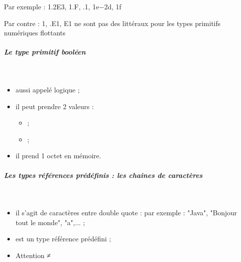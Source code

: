 \documentclass[11pt,a4paper]{article}
\begin{document}
          Par exemple : 1.2E3, 1.F, .1, 1e−2d, 1f
        
            \par
        
          Par contre : 1, .E1, E1 ne sont pas des litt\'eraux pour les types primitifs num\'eriques flottants
        
            \par
        
			
		\subparagraph{Le type primitif bool\'een} 
		
					\textcolor{white}{.} \par
				
            \par
        \verb@boolean@
					\begin{itemize}
				
			\item aussi appel\'e logique ; 
			\item  il peut prendre 2 valeurs :
              
					\begin{itemize}
				
			\item \verb@true@ ;
			\item \verb@false@ ;
					\end{itemize}
				
			\item il prend 1 octet en m\'emoire.
					\end{itemize}
				
            \par
        
			
		\subparagraph{Les types r\'ef\'erences pr\'ed\'efinis : les chaines de caract\`eres} 
		
					\textcolor{white}{.} \par
				
            \par
        \verb@String@
					\begin{itemize}
				
			\item il s'agit de caract\`eres entre double quote : par exemple : "Java", "Bonjour tout le monde", "a",...  ; 
			\item est un type r\'ef\'erence pr\'ed\'efini ;
			\item  Attention \verb@char@ ≠ \verb@String@
					\end{itemize}
				
            \par
\end{document}

